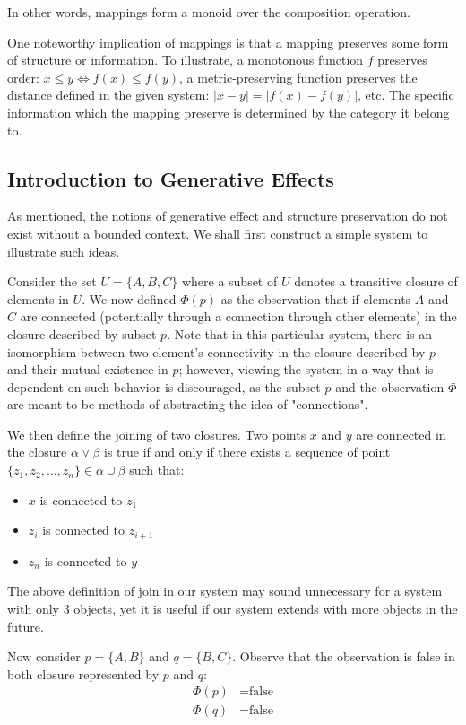 \documentclass[12pt]{article}
\theoremstyle{definition}
\newcommand{\mo}[1]{\lvert #1 \rvert}
\begin{document}
	In other words, mappings form a monoid over the composition operation.
	
	One noteworthy implication of mappings is that a mapping preserves some form of structure or information. To illustrate, a monotonous function $f$ preserves order: $x \leq y \iff f(x) \leq f(y)$, a metric-preserving function preserves the distance defined in the given system: $\mo{x - y} = \mo{f(x) - f(y)}$, etc. The specific information which the mapping preserve is determined by the category it belong to.
	
	\subsection{Introduction to Generative Effects}
	
	As mentioned, the notions of generative effect and structure preservation do not exist without a bounded context. We shall first construct a simple system to illustrate such ideas.
	
	Consider the set $U = \{A, B, C\}$ where a subset of $U$ denotes a transitive closure of elements in $U$. We now defined $\Phi(p)$ as the observation that if elements $A$ and $C$ are connected (potentially through a connection through other elements) in the closure described by subset $p$. Note that in this particular system, there is an isomorphism between two element's connectivity in the closure described by $p$ and their mutual existence in $p$; however, viewing the system in a way that is dependent on such behavior is discouraged, as the subset $p$ and the observation $\Phi$ are  meant to be methods of abstracting the idea of "connections".
	
	We then define the joining of two closures. Two points $x$ and $y$ are connected in the closure $\alpha \lor \beta$ is true if and only if there exists a sequence of point $\{z_1, z_2, \dots, z_n\} \in \alpha \cup \beta$ such that:
	\begin{itemize}
		\item $x$ is connected to $z_1$
		\item $z_i$ is connected to $z_{i + 1}$
		\item $z_n$ is connected to $y$
	\end{itemize}
	
	The above definition of join in our system may sound unnecessary for a system with only $3$ objects, yet it is useful if our system extends with more objects in the future.
	
	Now consider $p = \{A, B\}$ and $q = \{B, C\}$. Observe that the observation is false in both closure represented by $p$ and $q$:
	\begin{align*}
		\Phi(p) &= \text{false} \\
		\Phi(q) &= \text{false}
	\end{align*}
	
\end{document}
